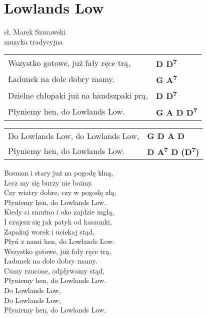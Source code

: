 \section{Lowlands Low}

sł. Marek Szurawski\\
muzyka tradycyjna

\vspace{2em}
\begin{tabular}{@{}p{7cm}@{}l@{}}
Wszystko gotowe, już fały ręce trą, & \bfseries D D\textsuperscript{7}\\
Ładunek na dole dobry mamy. & \bfseries G A\textsuperscript{7}\\
Dzielne chłopaki już na handszpaki prą, & \bfseries D D\textsuperscript{7}\\
Płyniemy hen, do Lowlands Low. & \bfseries G A D D\textsuperscript{7}\\
\end{tabular}

\vspace{1em}
\begin{tabular}{@{}p{7cm}@{}l@{}}
Do Lowlands Low, do Lowlands Low,& \bfseries G D A D\\
Płyniemy hen, do Lowlands Low. & \bfseries D A\textsuperscript{7} D (D\textsuperscript{7})\\
\end{tabular}

Bosman i stary już na pogodę klną, \\
Lecz my się burzy nie boimy. \\
Czy wiatry dobre, czy w pogodę złą, \\
Płyniemy hen, do Lowlands Low. \\

Kiedy ci smutno i oko zajdzie mgłą, \\
I czujesz się jak patyk od kaszanki, \\
Zapakuj worek i uciekaj stąd, \\
Płyń z nami hen, do Lowlands Low. \\

Wszystko gotowe, już fały ręce trą, \\
Ładunek na dole dobry mamy. \\
Cumy rzucone, odpływamy stąd, \\
Płyniemy hen, do Lowlands Low. \\

Do Lowlands Low, \\
Do Lowlands Low, \\
Płyniemy hen, do Lowlands Low.